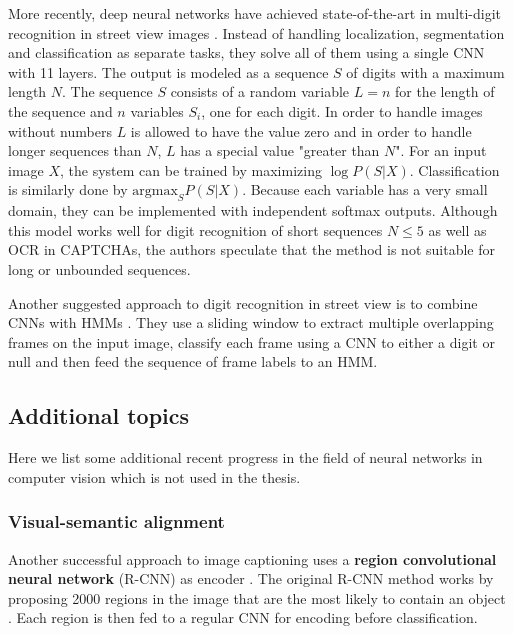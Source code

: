 More recently, deep neural networks have achieved state-of-the-art in multi-digit recognition in street view images \cite{multidigit_streetview}. Instead of handling localization, segmentation and classification as separate tasks, they solve all of them using a single CNN with 11 layers. The output is modeled as a sequence $S$ of digits with a maximum length $N$. The sequence $S$ consists of a random variable $L=n$ for the length of the sequence and $n$ variables $S_i$, one for each digit. In order to handle images without numbers $L$ is allowed to have the value zero and in order to handle longer sequences than $N$, $L$ has a special value "greater than $N$". For an input image $X$, the system can be trained by maximizing $\log P(S \vert X)$. Classification is similarly done by $\text{argmax}_S P(S \vert X)$.
Because each variable has a very small domain, they can be implemented with independent softmax outputs.
Although this model works well for digit recognition of short sequences $N \leq 5$ as well as OCR in CAPTCHAs, the authors speculate that the method is not suitable for long or unbounded sequences.

Another suggested approach to digit recognition in street view is to combine CNNs with HMMs \cite{multidigit_streetview_CNN_HMM}. They use a sliding window to extract multiple overlapping frames on the input image, classify each frame using a CNN to either a digit or null and then feed the sequence of frame labels to an HMM.



\subsection{Additional topics}

Here we list some additional recent progress in the field of neural networks in computer vision which is not used in the thesis.

\subsubsection{Visual-semantic alignment}


Another successful approach to image captioning uses a \textbf{region convolutional neural network} (R-CNN) as encoder \cite{VisualSemanticAlignment}.
The original R-CNN method works by proposing 2000 regions in the image that are the most likely to contain an object \cite{RCNN}. Each region is then fed to a regular CNN for encoding before classification.

